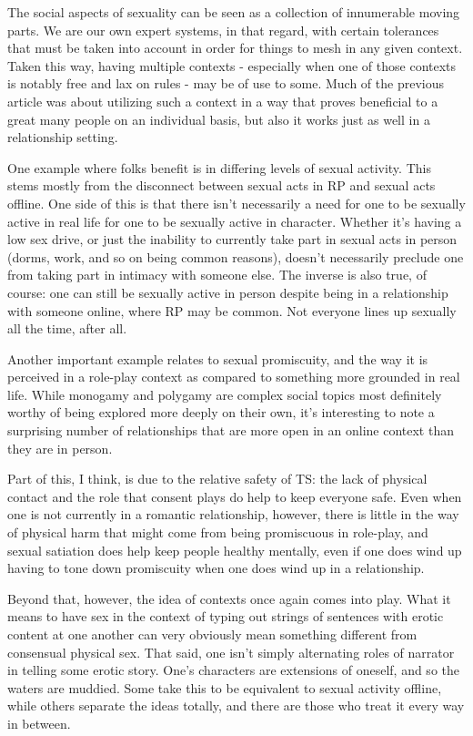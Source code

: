 The social aspects of sexuality can be seen as a collection of innumerable moving parts. We are our own expert systems, in that regard, with certain tolerances that must be taken into account in order for things to mesh in any given context. Taken this way, having multiple contexts - especially when one of those contexts is notably free and lax on rules - may be of use to some. Much of the previous article was about utilizing such a context in a way that proves beneficial to a great many people on an individual basis, but also it works just as well in a relationship setting.

One example where folks benefit is in differing levels of sexual activity. This stems mostly from the disconnect between sexual acts in RP and sexual acts offline. One side of this is that there isn't necessarily a need for one to be sexually active in real life for one to be sexually active in character. Whether it's having a low sex drive, or just the inability to currently take part in sexual acts in person (dorms, work, and so on being common reasons), doesn't necessarily preclude one from taking part in intimacy with someone else. The inverse is also true, of course: one can still be sexually active in person despite being in a relationship with someone online, where RP may be common. Not everyone lines up sexually all the time, after all.

Another important example relates to sexual promiscuity, and the way it is perceived in a role-play context as compared to something more grounded in real life. While monogamy and polygamy are complex social topics most definitely worthy of being explored more deeply on their own, it's interesting to note a surprising number of relationships that are more open in an online context than they are in person.

Part of this, I think, is due to the relative safety of TS: the lack of physical contact and the role that consent plays do help to keep everyone safe. Even when one is not currently in a romantic relationship, however, there is little in the way of physical harm that might come from being promiscuous in role-play, and sexual satiation does help keep people healthy mentally, even if one does wind up having to tone down promiscuity when one does wind up in a relationship.

Beyond that, however, the idea of contexts once again comes into play. What it means to have sex in the context of typing out strings of sentences with erotic content at one another can very obviously mean something different from consensual physical sex. That said, one isn't simply alternating roles of narrator in telling some erotic story. One's characters are extensions of oneself, and so the waters are muddied. Some take this to be equivalent to sexual activity offline, while others separate the ideas totally, and there are those who treat it every way in between.

